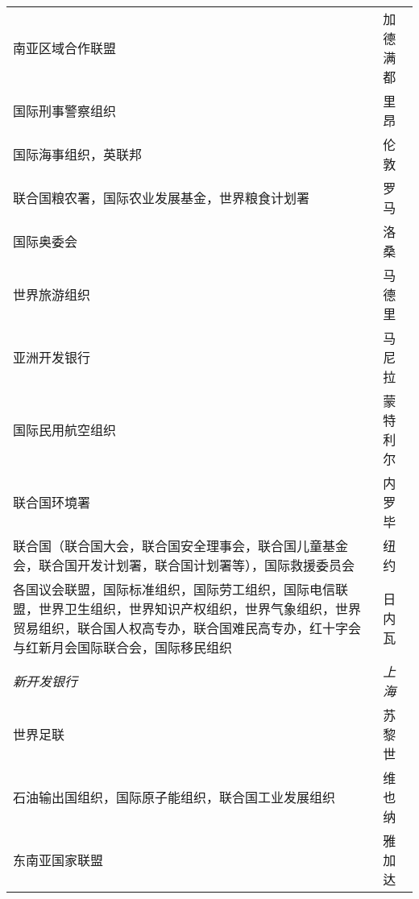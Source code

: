 \begin{table}
\begin{tabular}{p{11cm}<{\raggedright}p{2cm}<{\raggedright}}
    南亚区域合作联盟                                                                                          & 加德满都         \\
    国际刑事警察组织                                                                                          & 里昂           \\
    国际海事组织，英联邦                                                                                        & 伦敦           \\
    联合国粮农署，国际农业发展基金，世界粮食计划署                                                                           & 罗马           \\
    国际奥委会                                                                                             & 洛桑           \\
    世界旅游组织                                                                                            & 马德里          \\
    亚洲开发银行                                                                                            & 马尼拉          \\
    国际民用航空组织                                                                                          & 蒙特利尔         \\
    联合国环境署                                                                                            & 内罗毕          \\
    联合国（联合国大会，联合国安全理事会，联合国儿童基金会，联合国开发计划署，联合国计划署等），国际救援委员会                                             & 纽约           \\
    各国议会联盟，国际标准组织，国际劳工组织，国际电信联盟，世界卫生组织，世界知识产权组织，世界气象组织，世界贸易组织，联合国人权高专办，联合国难民高专办，红十字会与红新月会国际联合会，国际移民组织 & 日内瓦          \\
    \textit{新开发银行}                                                                                    & \textit{上海}  \\
    世界足联                                                                                              & 苏黎世          \\
    石油输出国组织，国际原子能组织，联合国工业发展组织                                                                         & 维也纳          \\
    东南亚国家联盟                                                                                           & 雅加达          \\ \bottomrule
    \end{tabular}
\end{table}
